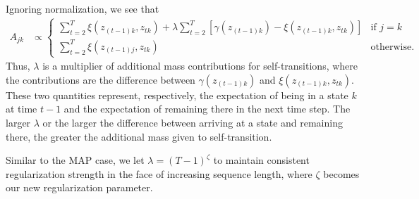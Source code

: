 Ignoring normalization, we see that
\begin{align*}
    A_{jk} &\propto \begin{cases} 
                \sum_{t=2}^{T} \xi(z_{(t-1)k}, z_{tk}) + \lambda\sum_{t=2}^{T}[\gamma(z_{(t-1)k}) - \xi(z_{(t-1)k}, z_{tk})] & \mbox{if } j=k \\ 
                \sum_{t=2}^{T} \xi(z_{(t-1)j}, z_{tk}) & \mbox{otherwise.}
              \end{cases}
\end{align*}
Thus, $\lambda$ is a multiplier of additional mass contributions for self-transitions, where the contributions are the difference between $\gamma(z_{(t-1)k})$ and $\xi(z_{(t-1)k}, z_{tk})$. These two quantities represent, respectively, the expectation of being in a state $k$ at time $t-1$ and the expectation of remaining there in the next time step. The larger $\lambda$ or the larger the difference between arriving at a state and remaining there, the greater the additional mass given to self-transition. 

Similar to the MAP case, we let $\lambda = (T-1)^{\zeta}$ to maintain consistent regularization strength in the face of increasing sequence length, where $\zeta$ becomes our new regularization parameter.
